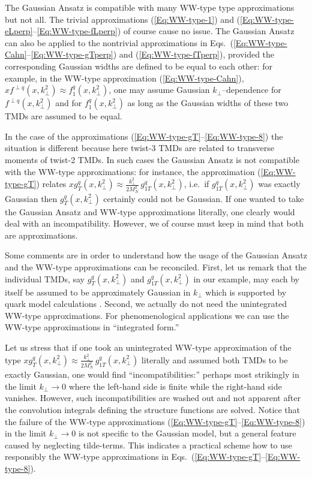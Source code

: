 \documentclass[a4paper,11pt]{article}
\def\kperp{k_\perp}
\begin{document}
The Gaussian Ansatz is compatible with many WW-type type approximations
but not all. The trivial approximations (\ref{Eq:WW-type-1}) and
(\ref{Eq:WW-type-eLperp}--\ref{Eq:WW-type-fLperp}) of course 
cause no issue. 
The Gaussian Ansatz can also be applied to the nontrivial approximations 
in Eqs.~(\ref{Eq:WW-type-Cahn}--\ref{Eq:WW-type-gTperp})
and (\ref{Eq:WW-type-fTperp}), provided the corresponding Gaussian 
widths are defined to be equal to each other: for example, in the 
WW-type approximation (\ref{Eq:WW-type-Cahn}),
$xf^{\perp q}(x,\kperp^2)\approx f_1^q(x,\kperp^2)$, one may 
assume Gaussian $\kperp$--dependence for $f^{\perp q}(x,\kperp^2)$ 
and for $f_1^q(x,\kperp^2)$ as long as the Gaussian widths
of these two TMDs are assumed to be equal.

In the case of the approximations 
(\ref{Eq:WW-type-gT}--\ref{Eq:WW-type-8})
the situation is different because here twist-3 TMDs
are related to transverse moments of twist-2 TMDs. In such cases the 
Gaussian Ansatz is not compatible with the WW-type approximations:
for instance, the approximation (\ref{Eq:WW-type-gT}) relates
$xg_T^q(x,\kperp^2)\approx\frac{k_\perp^2}{2M_N^2}\,g_{1T}^{q}(x,\kperp^2)$,
i.e.\ if $g_{1T}^q(x,\kperp^2)$ was exactly Gaussian then 
$g_T^q(x,\kperp^2)$ certainly could not be Gaussian. If one wanted to take
the Gaussian Ansatz and WW-type approximations literally, one clearly
would deal with an incompatibility. However, we of course must keep 
in mind that both are approximations. 

Some comments are in order to understand how the usage of the Gaussian 
Ansatz and the WW-type approximations can be reconciled.
First, let us remark that the individual TMDs, say 
$g_T^q(x,\kperp^2)$ and $g_{1T}^{q}(x,\kperp^2)$ in our example,
may each by itself be assumed to be approximately Gaussian in $k_\perp$
which is supported by quark model calculations \cite{Avakian:2010br}.
Second, we actually do not need the unintegrated WW-type approximations. 
For phenomenological applications we can use the WW-type approximations 
in ``integrated form.'' 

Let us stress that if one took an unintegrated WW-type approximation of the 
type $xg_T^q(x,\kperp^2)\approx\frac{k_\perp^2}{2M_N^2}\,g_{1T}^{q}(x,\kperp^2)$
literally and assumed both TMDs to be exactly Gaussian, one would find
``incompatibilities:'' perhaps most strikingly in the limit $k_\perp\to 0$
where the left-hand side is finite while the right-hand side vanishes.
However, such incompatibilities are washed out and not apparent after
the convolution integrals defining the structure functions are solved.
Notice that the failure of the WW-type approximations
(\ref{Eq:WW-type-gT}--\ref{Eq:WW-type-8}) in the limit $k_\perp\to 0$ is 
not specific to the Gaussian model,
but a general feature caused by neglecting tilde-terms. This indicates 
a practical scheme how to use responsibly the WW-type approximations in 
Eqs.~(\ref{Eq:WW-type-gT}--\ref{Eq:WW-type-8}).
\end{document}
